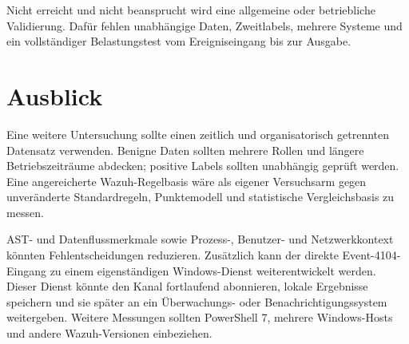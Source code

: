 \documentclass[12pt,a4paper,oneside,parskip=half]{scrreprt}
\begin{document}
Nicht erreicht und nicht beansprucht wird eine allgemeine oder betriebliche Validierung. Dafür fehlen unabhängige Daten, Zweitlabels, mehrere Systeme und ein vollständiger Belastungstest vom Ereigniseingang bis zur Ausgabe.

\section{Ausblick}
Eine weitere Untersuchung sollte einen zeitlich und organisatorisch getrennten Datensatz verwenden. Benigne Daten sollten mehrere Rollen und längere Betriebszeiträume abdecken; positive Labels sollten unabhängig geprüft werden. Eine angereicherte Wazuh-Regelbasis wäre als eigener Versuchsarm gegen unveränderte Standardregeln, Punktemodell und statistische Vergleichsbasis zu messen.

AST- und Datenflussmerkmale sowie Prozess-, Benutzer- und Netzwerkkontext könnten Fehlentscheidungen reduzieren. Zusätzlich kann der direkte Event-4104-Eingang zu einem eigenständigen Windows-Dienst weiterentwickelt werden. Dieser Dienst könnte den Kanal fortlaufend abonnieren, lokale Ergebnisse speichern und sie später an ein Überwachungs- oder Benachrichtigungssystem weitergeben. Weitere Messungen sollten PowerShell 7, mehrere Windows-Hosts und andere Wazuh-Versionen einbeziehen.
\end{document}
